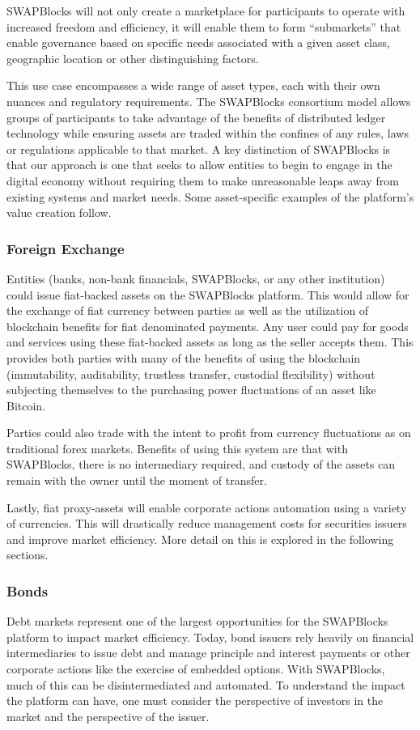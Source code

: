 \documentclass[12pt]{article}
\begin{document}
SWAPBlocks will not only create a marketplace for participants to operate with increased freedom and efficiency, 
it will enable them to form “submarkets” that enable governance based on specific needs associated with a given 
asset class, geographic location or other distinguishing factors.

This use case encompasses a wide range of asset types, each with their own nuances and regulatory requirements. 
The SWAPBlocks consortium model allows groups of participants to take advantage of the benefits of distributed 
ledger technology while ensuring assets are traded within the confines of any rules, laws or regulations 
applicable to that market. A key distinction of SWAPBlocks is that our approach is one that seeks to allow entities 
to begin to engage in the digital economy without requiring them to make unreasonable leaps away from existing 
systems and market needs. Some asset-specific examples of the platform’s value creation follow.

\subsubsection{Foreign Exchange}

Entities (banks, non-bank financials, SWAPBlocks, or any other institution) could issue fiat-backed assets on 
the SWAPBlocks platform. This would allow for the exchange of fiat currency between parties as well as the utilization 
of blockchain benefits for fiat denominated payments. Any user could pay for goods and services using these fiat-backed 
assets as long as the seller accepts them. This provides both parties with many of the benefits of using the 
blockchain (immutability, auditability, trustless transfer, custodial flexibility) without subjecting themselves to 
the purchasing power fluctuations of an asset like Bitcoin.

Parties could also trade with the intent to profit from currency fluctuations as on traditional forex markets. Benefits of 
using this system are that with SWAPBlocks, there is no intermediary required, and custody of the assets can remain 
with the owner until the moment of transfer.

Lastly, fiat proxy-assets will enable corporate actions automation using a variety of currencies. This will drastically reduce management costs for securities issuers and improve market efficiency. More detail on this is explored in the following sections.


\subsubsection{Bonds}
Debt markets represent one of the largest opportunities for the SWAPBlocks platform to impact market efficiency. 
Today, bond issuers rely heavily on financial intermediaries to issue debt and manage principle and interest payments 
or other corporate actions like the exercise of embedded options. With SWAPBlocks, much of this can be disintermediated 
and automated. To understand the impact the platform can have, one must consider the perspective of investors in 
the market and the perspective of the issuer.
\end{document}

